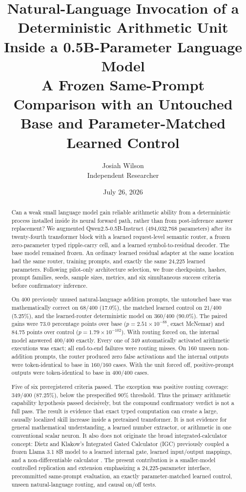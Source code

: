 \documentclass[11pt]{article}
\title{\textbf{Natural-Language Invocation of a Deterministic Arithmetic
Unit Inside a 0.5B-Parameter Language Model}\\
\large A Frozen Same-Prompt Comparison with an Untouched Base and
Parameter-Matched Learned Control}
\author{Josiah Wilson\\Independent Researcher}
\date{July 26, 2026}
\begin{document}
\maketitle

\begin{abstract}
Can a weak small language model gain reliable arithmetic ability from a
deterministic process installed inside its neural forward path, rather than
from post-inference answer replacement? We augmented
Qwen2.5-0.5B-Instruct (494,032,768 parameters) after its twenty-fourth
transformer block with a learned request-level semantic router, a frozen
zero-parameter typed ripple-carry cell, and a learned symbol-to-residual
decoder. The base model remained frozen. An ordinary learned residual adapter
at the same location had the same router, training prompts, and exactly the
same 24,225 learned parameters. Following pilot-only architecture selection,
we froze checkpoints, hashes, prompt families, seeds, sample sizes, metrics,
and six simultaneous success criteria before confirmatory inference.

On 400 previously unused natural-language addition prompts, the untouched base
was mathematically correct on 68/400 (17.0\%), the matched learned control on
21/400 (5.25\%), and the learned-router deterministic model on 360/400
(90.0\%). The paired gains were 73.0 percentage points over base
(\(p=2.51\times10^{-88}\), exact McNemar) and 84.75 points over control
(\(p=1.79\times10^{-102}\)). With routing forced on, the internal model
answered 400/400 exactly. Every one of 349 automatically activated arithmetic
executions was exact; all end-to-end failures were routing misses. On 160
unseen non-addition prompts, the router produced zero false activations and
the internal outputs were token-identical to base in 160/160 cases. With the
unit forced off, positive-prompt outputs were token-identical to base in
400/400 cases.

Five of six preregistered criteria passed. The exception was positive routing
coverage: 349/400 (87.25\%), below the prespecified 90\% threshold. Thus the
primary arithmetic capability hypothesis passed decisively, but the compound
confirmatory verdict is not a full pass. The result is evidence that exact
typed computation can create a large, causally localized skill increase
inside a pretrained transformer. It is not evidence for general mathematical
understanding, a learned number extractor, or arithmetic in one conventional
scalar neuron. It also does not originate the broad integrated-calculator
concept: Dietz and Klakow's Integrated Gated Calculator (IGC) previously
coupled a frozen Llama 3.1 8B model to a learned internal gate, learned
input/output mappings, and a non-differentiable calculator
\cite{dietz2025}. The present contribution is a smaller-model controlled
replication and extension emphasizing a 24,225-parameter interface,
precommitted same-prompt evaluation, an exactly parameter-matched learned
control, unseen natural-language routing, and causal on/off tests.
\end{abstract}
\end{document}
